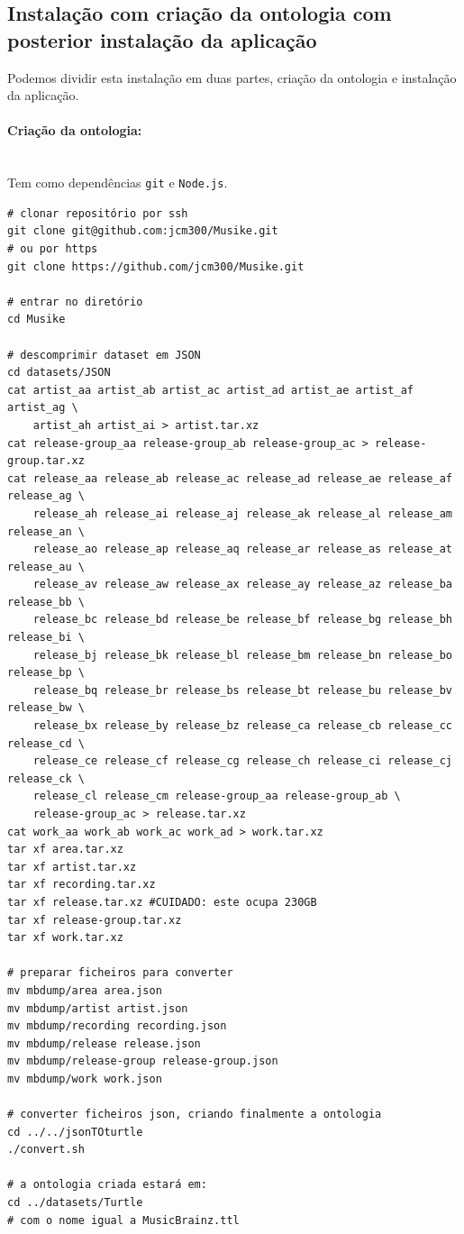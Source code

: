 \documentclass{article}
\begin{document}
\subsection{Instalação com criação da ontologia com posterior instalação da aplicação}

Podemos dividir esta instalação em duas partes, criação da ontologia e instalação da aplicação.

\paragraph{Criação da ontologia:}\mbox{}\\

Tem como dependências \texttt{git} e \texttt{Node.js}.

\begin{framed}
\begin{verbatim}
# clonar repositório por ssh
git clone git@github.com:jcm300/Musike.git
# ou por https
git clone https://github.com/jcm300/Musike.git

# entrar no diretório
cd Musike

# descomprimir dataset em JSON
cd datasets/JSON
cat artist_aa artist_ab artist_ac artist_ad artist_ae artist_af artist_ag \ 
    artist_ah artist_ai > artist.tar.xz
cat release-group_aa release-group_ab release-group_ac > release-group.tar.xz
cat release_aa release_ab release_ac release_ad release_ae release_af release_ag \ 
    release_ah release_ai release_aj release_ak release_al release_am release_an \
    release_ao release_ap release_aq release_ar release_as release_at release_au \
    release_av release_aw release_ax release_ay release_az release_ba release_bb \
    release_bc release_bd release_be release_bf release_bg release_bh release_bi \
    release_bj release_bk release_bl release_bm release_bn release_bo release_bp \
    release_bq release_br release_bs release_bt release_bu release_bv release_bw \
    release_bx release_by release_bz release_ca release_cb release_cc release_cd \
    release_ce release_cf release_cg release_ch release_ci release_cj release_ck \
    release_cl release_cm release-group_aa release-group_ab \
    release-group_ac > release.tar.xz
cat work_aa work_ab work_ac work_ad > work.tar.xz
tar xf area.tar.xz
tar xf artist.tar.xz
tar xf recording.tar.xz
tar xf release.tar.xz #CUIDADO: este ocupa 230GB
tar xf release-group.tar.xz
tar xf work.tar.xz

# preparar ficheiros para converter
mv mbdump/area area.json
mv mbdump/artist artist.json
mv mbdump/recording recording.json
mv mbdump/release release.json
mv mbdump/release-group release-group.json
mv mbdump/work work.json

# converter ficheiros json, criando finalmente a ontologia
cd ../../jsonTOturtle
./convert.sh

# a ontologia criada estará em:
cd ../datasets/Turtle
# com o nome igual a MusicBrainz.ttl 
\end{verbatim}
\end{framed}
\end{document}
